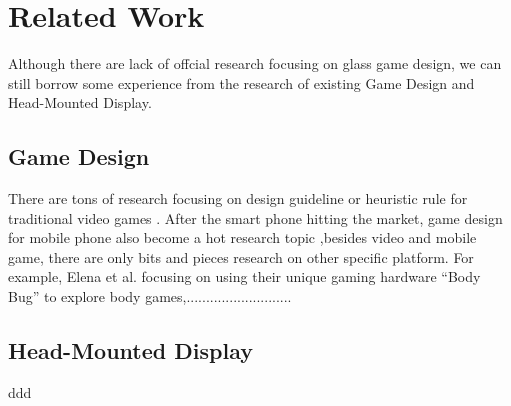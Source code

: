\section{Related Work}

Although there are lack of offcial research focusing on glass game design, we can still borrow some experience from the research of existing Game Design and Head-Mounted Display.

\subsection{Game Design}

There are tons of research focusing on design guideline or heuristic rule for traditional video games \cite{gameflow,chi08video,criticalreview,chi04game,09game,02game,08game,07game}. After the smart phone hitting the market, game design for mobile phone also become a hot research topic \cite{mobilegame,mobile06,mobile08,icec06},besides video and mobile game, there are only bits and pieces research on other specific platform. For example, Elena et al. focusing on using their unique gaming hardware ``Body Bug'' to explore body games\cite{bodygame},...........................







\subsection{Head-Mounted Display}
ddd